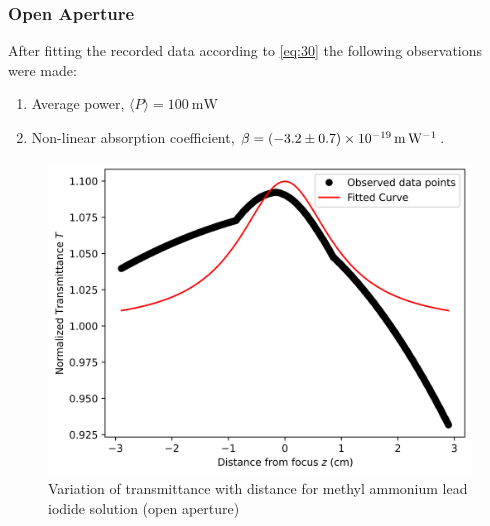 \documentclass[%
 reprint,
 amsmath,amssymb,
 aps,
]{revtex4-2}
\begin{document}
		\subsubsection{Open Aperture}
		After fitting the recorded data according to \eqref{eq:30} the following observations were made:
		\begin{enumerate} 
			\item Average power, $ \langle P \rangle  = \SI{100}{\milli \watt}$
			\item Non-linear absorption coefficient, $ \beta = \SI[separate-uncertainty=true]{-3.2 \pm 0.7e-19}{\meter \per \watt} $.
		\end{enumerate}
		\begin{figure}
			\includegraphics[scale = 0.59]{satyl-o}
			\caption{Variation of transmittance with distance for methyl ammonium lead iodide solution (open aperture)}
		\end{figure}
	
\end{document}
